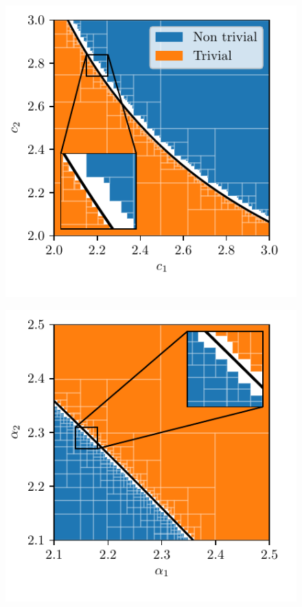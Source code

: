 \documentclass[
11pt, %
english, %
singlespacing, %
nolistspacing, %
liststotoc, %
headsepline, %
]{MastersDoctoralThesis} %
\begin{document}
\begin{figure}
	\ffigbox
	{
	\newcommand{\capcorrection}{\vspace{-10pt}}
	\begin{subfloatrow}
		{
			\capcorrection
			\includegraphics[scale=0.85]{critical_region_ErdosRenyiGraph_ErdosRenyiGraph.pdf}
		}{\caption{}}
		{
			\capcorrection
			\includegraphics[scale=0.85]{critical_region_ScaleFreeGraph_ScaleFreeGraph.pdf}
}
\end{subfloatrow}}
\end{figure}
\end{document}

